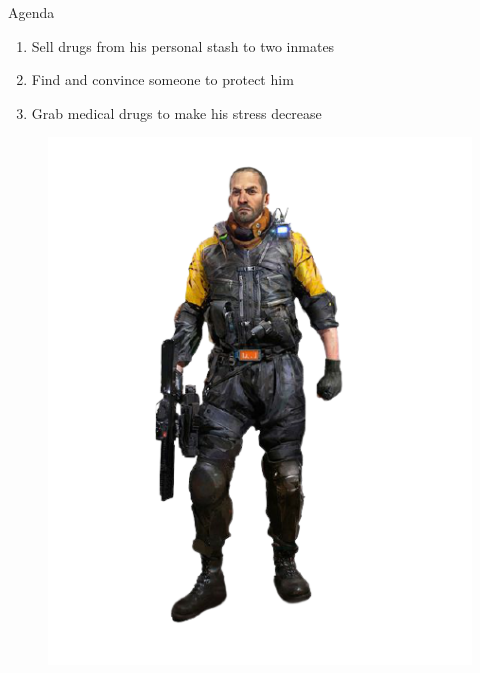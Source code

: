 \begin{rpg-commentbox}{Agenda}
    \begin{enumerate}[label=\textbf{Act \arabic*}, leftmargin=1cm]
        \item Sell drugs from his personal stash to two inmates
        \item Find and convince someone to protect him
        \item Grab medical drugs to make his stress decrease
    \end{enumerate}
\end{rpg-commentbox}


\begin{figure}
    \hspace*{-1in}
    \includegraphics[width=.70\textwidth]{img/bg/firefighter-6.png}
    \label{fig:refinery}
\end{figure}

\clearpage



